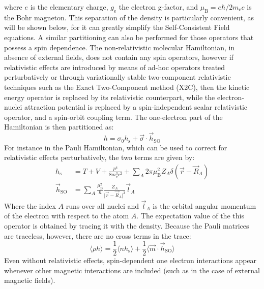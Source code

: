 \documentclass[12pt]{article}
\newcommand{\ev}[1]{\langle #1 \rangle}
\begin{document}
where $e$ is the elementary charge, $g_\mathrm{e}$ the electron g-factor, and $\mu_\mathrm{B}=e\hbar/2m_\mathrm{e}c$ is the Bohr magneton.
This separation of the density is particularly convenient, as will be shown below, for it can greatly simplify the Self-Consistent Field equations.
A similar partitioning can also be performed for those operators that possess a spin dependence.
The non-relativistic molecular Hamiltonian, in absence of external fields, does not contain any spin operators, however if relativistic effects are introduced by means of ad-hoc operators treated perturbatively or through variationally stable two-component relativistic techniques such as the Exact Two-Component method (X2C),\cite{Liu09_219,Liu10_532,Liu09_1945,Saue09_2091} then the kinetic energy operator is replaced by its relativistic counterpart, while the electron-nuclei attraction potential is replaced by a spin-independent scalar relativistic operator, and a spin-orbit coupling term.
The one-electron part of the Hamiltonian is then partitioned as:
\begin{equation}
 h = \sigma_0 h_\mathrm{s} + \vec{\sigma}\cdot\vec{h}_\mathrm{SO}
\end{equation}
For instance in the Pauli Hamiltonian, which can be used to correct for relativistic effects perturbatively, the two terms are given by:
\begin{align}
 h_\mathrm{s} &= T + V + \frac{p^4}{8m_\mathrm{e}^3c^2} + \sum_A 2\pi\mu_\mathrm{B}^2 Z_A\delta(\vec{r}-\vec{R}_A) \\
 \vec{h}_\mathrm{SO} &= \sum_A\frac{\mu_\mathrm{B}^2}{\hbar}\frac{Z_A}{\vert\vec{r}-\vec{R}_A\vert^3}\vec{l}_A
\end{align}
Where the index $A$ runs over all nuclei and $\vec{l}_A$ is the orbital angular momentum of the electron with respect to the atom $A$.
The expectation value of the this operator is obtained by tracing it with the density.
Because the Pauli matrices are traceless, however, there are no cross terms in the trace:
\begin{equation}
 \ev{\rho h} = \frac{1}{2}\ev{nh_\mathrm{s}} + \frac{1}{2}\ev{\vec{m}\cdot\vec{h}_\mathrm{SO}}
\end{equation}
Even without relativistic effects, spin-dependent one electron interactions appear whenever other magnetic interactions are included (such as in the case of external magnetic fields).
\end{document}
